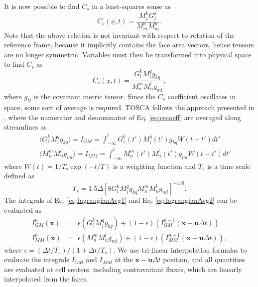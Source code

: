 \documentclass[journal abbreviation, manuscript]{copernicus}
\begin{document}
It is now possible to find $C_s$ in a least-squares sense as 
\begin{equation}
	C_s(\underline{x},t) = \frac{M_j^k G_j^k}{M_m^n M_m^n} . \nonumber
\end{equation}
Note that the above relation is not invariant with respect to rotation of the reference frame, because it implicitly contains the face area vectors, hence tensors are no longer symmetric. Variables must then be transformed into physical space to find $C_s$ as
\begin{equation}
	C_s(\underline{x},t) = \frac{G_i^kM_i^q g_{kq}}{M_n^m M_n^l g_{ml}}, \label{eq:cscoeff}
\end{equation}
where $g_{ij}$ is the covariant metric tensor. Since the $C_s$ coefficient oscillates in space, some sort of average is required. TOSCA follows the approach presented in \cite{1996_MeneveauEtAl}, where the numerator and denominator of Eq. \ref{eq:cscoeff} are averaged along streamlines as
\begin{eqnarray}
	&&\langle G_i^kM_i^q g_{kq} \rangle = I_{GM} = \int_{-\infty}^{t}G_i^k(t')M_i^q(t')g_{kq}W(t-t')dt' \label{eq:lagrangianAvg1} \\
	&&\langle M_n^mM_n^l g_{ml} \rangle = I_{MM} = \int_{-\infty}^{t}M_n^m(t')M_n^l(t')g_{ml}W(t-t')dt' \label{eq:lagrangianAvg2}
\end{eqnarray}
where $W(t) = 1/T_s \exp(-t/T)$ is a weighting function and $T_s$ is a time scale defined as
\begin{equation}
	T_s = 1.5\Delta \left[8G_i^kM_i^q g_{kq} M_n^mM_n^l g_{ml}\right]^{-1/8}.
\end{equation}
The integrals of Eq. \ref{eq:lagrangianAvg1} and Eq. \ref{eq:lagrangianAvg2} can be evaluated as
\begin{eqnarray}
	I_{GM}^n(\mathbf{x})  &=& \epsilon(G_i^kM_i^q g_{kq}) + (1-\epsilon)(I_{GM}^{n-1}(\mathbf{x} - \mathbf{u}\Delta t)) \label{eq:lagrangianAvg3} \\
	I_{MM}^n(\mathbf{x})  &=& \epsilon(M_n^mM_n^l g_{ml}) + (1-\epsilon)(I_{MM}^{n-1}(\mathbf{x} - \mathbf{u}\Delta t)) \label{eq:lagrangianAvg4},
\end{eqnarray}
where $\epsilon = (\Delta t / T_s)/(1 + \Delta t / T_s)$. We use tri-linear interpolation formulas to evaluate the integrals $I_{GM}$ and $I_{MM}$ at the $\mathbf{x} - \mathbf{u}\Delta t$ position, and all quantities are evaluated at cell centers, including contravariant fluxes, which are linearly interpolated from the faces. 
\end{document}

